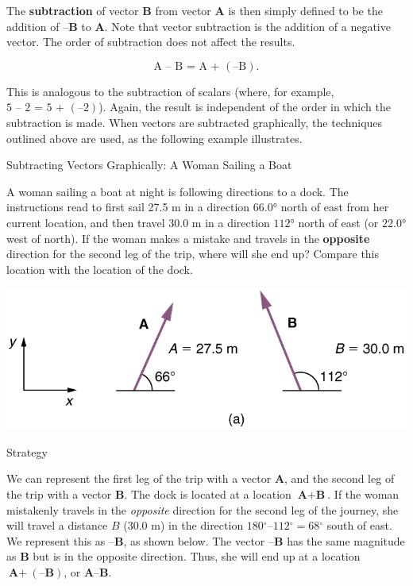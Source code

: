 \documentclass[
]{book}
\newenvironment{tinysection}{}{}
\begin{document}
The \textbf{subtraction} of vector \(\textbf{B}{}\) from vector \(\textbf{A}{}\)
is then simply defined to be the addition of \(\textbf{–B}{}\) to
\(\textbf{A}{}\). Note that vector subtraction is the addition of a
negative vector. The order of subtraction does not affect the results.

\leavevmode\hypertarget{eip-454}{}%
\[{\text{A~–~B~=~A~+~}(\text{–B})}{}\text{.}\]

This is analogous to the subtraction of scalars (where, for example,
\({\text{5~–~2~=~5~+~}(\text{–2})}{}\)). Again, the result is independent
of the order in which the subtraction is made. When vectors are
subtracted graphically, the techniques outlined above are used, as the
following example illustrates.

\hypertarget{fs-id1165296679497}{}
Subtracting Vectors Graphically: A Woman Sailing a Boat

A woman sailing a boat at night is following directions to a dock. The
instructions read to first sail 27.5 m in a direction \(\text{66.0°}{}\)
north of east from her current location, and then travel 30.0 m in a
direction \(\text{112°}\) north of east (or \(\text{22.0°}{}\) west of
north). If the woman makes a mistake and travels in the \textbf{opposite}
direction for the second leg of the trip, where will she end up? Compare
this location with the location of the dock.

\includegraphics{images/Figure_03_02_14.jpg}

\begin{tinysection}

{Strategy}

\end{tinysection}

We can represent the first leg of the trip with a vector \(\textbf{A}\),
and the second leg of the trip with a vector \(\textbf{B}{}\). The dock is
located at a location \({\textbf{A} + \textbf{B}}{}\). If the woman
mistakenly travels in the \emph{opposite} direction for the second leg of the
journey, she will travel a distance \(B\) (30.0 m) in the direction
\({180{^\circ}–112{^\circ} = 68{^\circ}}{}\) south of east. We represent
this as \(\textbf{–B}{}\), as shown below. The vector \(\textbf{–B}\) has
the same magnitude as \(\textbf{B}\) but is in the opposite direction.
Thus, she will end up at a location \({\textbf{A} +}(\textbf{–B})\), or
\({\textbf{A}–\textbf{B}}{}\).
\end{document}
